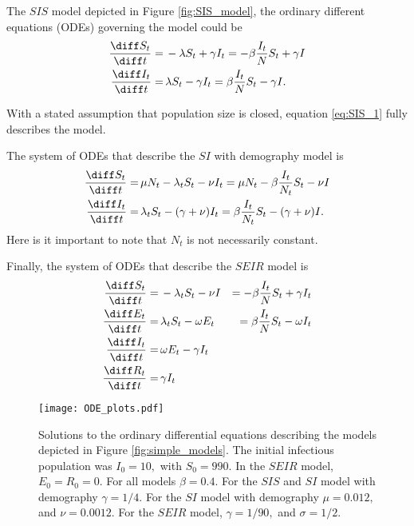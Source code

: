 The $SIS$ model depicted in Figure \ref{fig:SIS_model}, the ordinary different
equations (ODEs) governing the model could be \begin{align}
    \frac{\diff S_t}{\diff t} = & \, -\lambda S_t + \gamma I_t = -\beta \frac{I_t}{N}S_t + \gamma I\label{eq:SIS_1} \\
    \frac{\diff I_t}{\diff t} = & \, \lambda S_t - \gamma I_t = \beta \frac{I_t}{N}S_t - \gamma I\label{eq:SIS_2}.
\end{align}

With a stated assumption that population size is closed, equation \ref{eq:SIS_1} fully describes the model.

The system of ODEs that describe the $SI$ with demography model is \begin{align}
    \frac{\diff S_t}{\diff t} = & \, \mu N_t - \lambda_t S_t - \nu I_t = \mu N_t -\beta \frac{I_t}{N_t}S_t - \nu I \label{eq:SI_1}   \\
    \frac{\diff I_t}{\diff t} = & \, \lambda_t S_t - (\gamma + \nu)I_t = \beta \frac{I_t}{N_t}S_t - (\gamma + \nu) I\label{eq:SI_2}.
\end{align} Here is it important to note that $N_t$ is not necessarily constant.

Finally, the system of ODEs that describe the $SEIR$ model is \begin{align}
    \frac{\diff S_t}{\diff t} = & \, - \lambda_t S_t - \nu I                   & = -\beta \frac{I_t}{N}S_t + \gamma I_t \label{eq:SEIR_1} \\
    \frac{\diff E_t}{\diff t} = & \, \lambda_t S_t - \omega E_t                & = \beta \frac{I_t}{N}S_t - \omega I_t \label{eq:SEIR_2}  \\
    \frac{\diff I_t}{\diff t} = & \, \omega E_t - \gamma I_t \label{eq:SEIR_3}                                                            \\
    \frac{\diff R_t}{\diff t} = & \, \gamma I_t \label{eq:SEIR_4}
\end{align}

\begin{figure}[htbp]
    \centering
    \texttt{[image: ODE\_plots.pdf]}
    \caption{
        Solutions to the ordinary differential equations describing the models
        depicted in Figure \ref{fig:simple_models}. The initial infectious
        population was $I_0 = 10,$ with $S_0 = 990.$ In the $SEIR$ model,
        $E_0 = R_0 = 0.$ For all models $\beta = 0.4.$ For the $SIS$ and $SI$
        model with demography $\gamma = 1/4.$ For the $SI$ model with
        demography $\mu = 0.012,$ and $\nu = 0.0012.$ For the $SEIR$ model,
        $\gamma = 1/90,$ and $\sigma = 1/2.$
    }
    \label{fig:ODE_outputs}
\end{figure}

